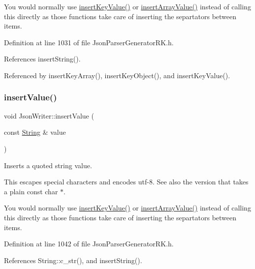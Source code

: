 You would normally use \hyperlink{class_json_writer_ac2de627389b59ce2c8ed95e10ea213bf}{insert\+Key\+Value()} or \hyperlink{class_json_writer_a8b4dc6726b66b4f277c7674e60c8a057}{insert\+Array\+Value()} instead of calling this directly as those functions take care of inserting the separtators between items. 

Definition at line 1031 of file Json\+Parser\+Generator\+R\+K.\+h.



References insert\+String().



Referenced by insert\+Key\+Array(), insert\+Key\+Object(), and insert\+Key\+Value().

\mbox{\label{class_json_writer_a6f8a280756ada908ab7e643f6dd1faa9}} 
\subsubsection{\texorpdfstring{insert\+Value()}{insertValue()}\hspace{0.1cm}{\footnotesize\ttfamily [9/9]}}
{\footnotesize\ttfamily void Json\+Writer\+::insert\+Value (\begin{DoxyParamCaption}\item[{const \hyperlink{class_string}{String} \&}]{value }\end{DoxyParamCaption})\hspace{0.3cm}{\ttfamily [inline]}}



Inserts a quoted string value. 

This escapes special characters and encodes utf-\/8. See also the version that takes a plain const char $\ast$.

You would normally use \hyperlink{class_json_writer_ac2de627389b59ce2c8ed95e10ea213bf}{insert\+Key\+Value()} or \hyperlink{class_json_writer_a8b4dc6726b66b4f277c7674e60c8a057}{insert\+Array\+Value()} instead of calling this directly as those functions take care of inserting the separtators between items. 

Definition at line 1042 of file Json\+Parser\+Generator\+R\+K.\+h.



References String\+::c\+\_\+str(), and insert\+String().

\mbox{\label{class_json_writer_a6c1f223b7ef6538ef9135fe0a8b66aab}} 
